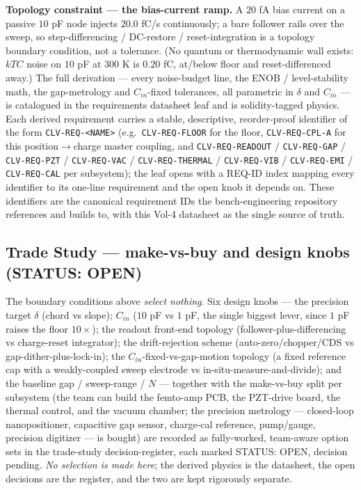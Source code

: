 \textbf{Topology constraint --- the bias-current ramp.} A $20$ fA bias current on a passive $10$ pF node injects $20.0$ fC/s continuously; a bare follower rails over the sweep, so step-differencing / DC-restore / reset-integration is a topology boundary condition, not a tolerance. (No quantum or thermodynamic wall exists: $kTC$ noise on $10$ pF at $300$ K is $0.20$ fC, at/below floor and reset-differenced away.) The full derivation --- every noise-budget line, the ENOB / level-stability math, the gap-metrology and $C_{in}$-fixed tolerances, all parametric in $\delta$ and $C_{in}$ --- is catalogued in the requirements datasheet leaf and is solidity-tagged physics. Each derived requirement carries a stable, descriptive, reorder-proof identifier of the form \texttt{CLV-REQ-<NAME>} (e.g.\ \texttt{CLV-REQ-FLOOR} for the floor, \texttt{CLV-REQ-CPL-A} for this position$\to$charge master coupling, and \texttt{CLV-REQ-READOUT} / \texttt{CLV-REQ-GAP} / \texttt{CLV-REQ-PZT} / \texttt{CLV-REQ-VAC} / \texttt{CLV-REQ-THERMAL} / \texttt{CLV-REQ-VIB} / \texttt{CLV-REQ-EMI} / \texttt{CLV-REQ-CAL} per subsystem); the leaf opens with a REQ-ID index mapping every identifier to its one-line requirement and the open knob it depends on. These identifiers are the canonical requirement IDs the bench-engineering repository references and builds to, with this Vol-4 datasheet as the single source of truth.

\subsection{Trade Study --- make-vs-buy and design knobs (STATUS: OPEN)}

The boundary conditions above \emph{select nothing}. Six design knobs --- the precision target $\delta$ (chord vs slope); $C_{in}$ ($10$ pF vs $1$ pF, the single biggest lever, since $1$ pF raises the floor $10\times$); the readout front-end topology (follower-plus-differencing vs charge-reset integrator); the drift-rejection scheme (auto-zero/chopper/CDS vs gap-dither-plus-lock-in); the $C_{in}$-fixed-vs-gap-motion topology (a fixed reference cap with a weakly-coupled sweep electrode vs in-situ-measure-and-divide); and the baseline gap / sweep-range / $N$ --- together with the make-vs-buy split per subsystem (the team can build the femto-amp PCB, the PZT-drive board, the thermal control, and the vacuum chamber; the precision metrology --- closed-loop nanopositioner, capacitive gap sensor, charge-cal reference, pump/gauge, precision digitizer --- is bought) are recorded as fully-worked, team-aware option sets in the trade-study decision-register, each marked STATUS: OPEN, decision pending. \emph{No selection is made here}; the derived physics is the datasheet, the open decisions are the register, and the two are kept rigorously separate.


